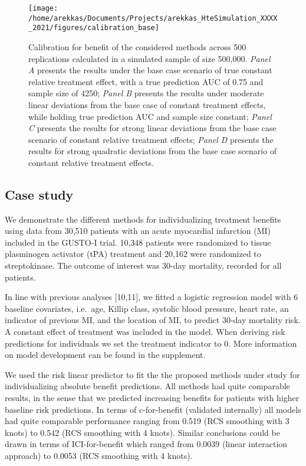 \documentclass{article}
\begin{document}
\begin{figure}
\texttt{[image: /home/arekkas/Documents/Projects/arekkas\_HteSimulation\_XXXX\_2021/figures/calibration\_base]} \caption{Calibration for benefit of the considered methods across 500 replications calculated in a simulated sample of size 500,000. \textit{Panel A} presents the results under the base case scenario of true constant relative treatment effect, with a true prediction AUC of 0.75 and sample size of 4250; \textit{Panel B} presents the results under moderate linear deviations from the base case of constant treatment effects, while holding true prediction AUC and sample size constant; \textit{Panel C} presents the results for strong linear deviations from the base case scenario of constant relative treatment effects; \textit{Panel D} presents the results for strong quadratic deviations from the base case scenario of constant relative treatment effects.}\label{fig:calibration}
\end{figure}

\hypertarget{case-study}{%
\subsection{Case study}\label{case-study}}

We demonstrate the different methods for individualizing treatment
benefits using data from 30,510 patients with an acute myocardial
infarction (MI) included in the GUSTO-I trial. 10,348 patients were
randomized to tissue plasminogen activator (tPA) treatment and 20,162
were randomized to streptokinase. The outcome of interest was 30-day
mortality, recorded for all patients.

In line with previous analyses {[}10,11{]}, we fitted a logistic
regression model with 6 baseline covariates, i.e.~age, Killip class,
systolic blood pressure, heart rate, an indicator of previous MI, and
the location of MI, to predict 30-day mortality risk. A constant effect
of treatment was included in the model. When deriving risk predictions
for individuals we set the treatment indicator to 0. More information on
model development can be found in the supplement.

We used the risk linear predictor to fit the the proposed methods under
study for individualizing absolute benefit predictions. All methods had
quite comparable results, in the sense that we predicted increasing
benefits for patients with higher baseline risk predictions. In terms of
c-for-benefit (validated internally) all models had quite comparable
performance ranging from 0.519 (RCS smoothing with 3 knots) to 0.542
(RCS smoothing with 4 knots). Similar conclusions could be drawn in
terms of ICI-for-benefit which ranged from 0.0039 (linear interaction
approach) to 0.0053 (RCS smoothing with 4 knots).
\end{document}
